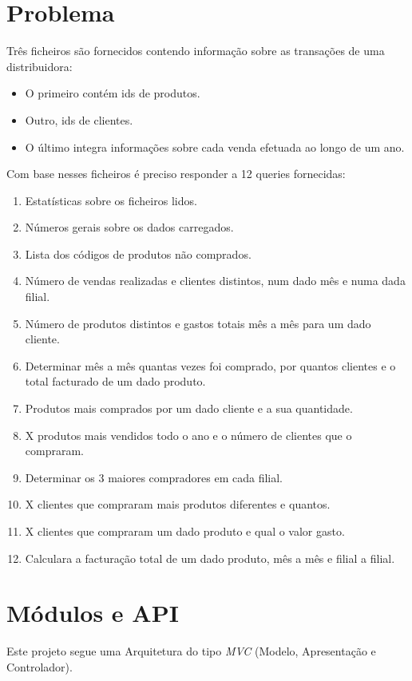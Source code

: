 \documentclass[a4paper]{report}
\begin{document}
\chapter{Problema}
Três ficheiros são fornecidos contendo informação sobre as transações de uma distribuidora:
\begin{itemize}
    \item O primeiro contém ids de produtos.
    \item Outro, ids de clientes.
    \item O último integra informações sobre cada venda efetuada ao longo de um ano. 
\end{itemize}
Com base nesses ficheiros é preciso responder a 12 queries fornecidas:
\begin{enumerate}
    \item Estatísticas sobre os ficheiros lidos.
    \item Números gerais sobre os dados carregados.
    \item Lista dos códigos de produtos não comprados.
    \item Número de vendas realizadas e clientes distintos, num dado mês e numa dada filial.
    \item Número de produtos distintos e gastos totais mês a mês para um dado cliente.
    \item Determinar mês a mês quantas vezes foi comprado, por quantos clientes e o total facturado de um dado produto.
    \item Produtos mais comprados por um dado cliente e a sua quantidade.
    \item X produtos mais vendidos todo o ano e o número de clientes que o compraram.
    \item Determinar os 3 maiores compradores em cada filial.
    \item X clientes que compraram mais produtos diferentes e quantos.
    \item X clientes que compraram um dado produto e qual o valor gasto.
    \item Calculara a facturação total de um dado produto, mês a mês e filial a filial.
\end{enumerate}

\chapter{Módulos e API}\label{chap:api}

Este projeto segue uma Arquitetura do tipo \textit{MVC} (Modelo, Apresentação e
Controlador).
\end{document}

